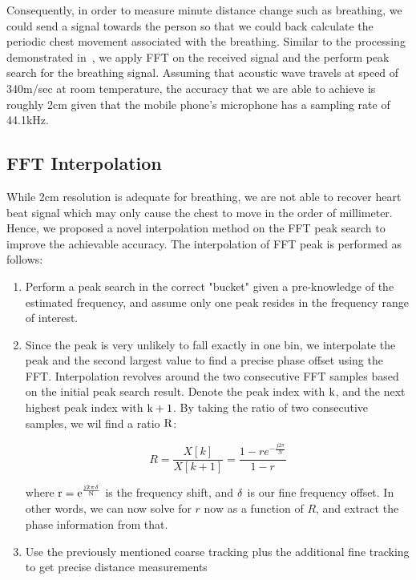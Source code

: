 Consequently, in order to measure minute distance change such as breathing, we could send a signal towards the person so that we could back calculate the periodic chest movement associated with the breathing. Similar to the processing demonstrated in~\cite{Adib_acm15,nandakumar_mobisys15}, we apply FFT on the received signal and the perform peak search for the breathing signal. Assuming that acoustic wave travels at speed of 340m/sec at room temperature, the accuracy that we are able to achieve is roughly 2cm given that the mobile phone's microphone has a sampling rate of 44.1kHz.

\subsection{FFT Interpolation}
\label{sec:fftinterp}
While 2cm resolution is adequate for breathing, we are not able to recover heart beat signal which may only cause the chest to move in the order of millimeter. Hence, we proposed a novel interpolation method on the FFT peak search to improve the achievable accuracy. The interpolation of FFT peak is performed as follows:

%
\begin{enumerate}
	\item Perform a peak search in the correct "bucket" given a pre-knowledge of the estimated frequency, and assume only one peak resides in the frequency range of interest.
	\item Since the peak is very unlikely to fall exactly in one bin, we interpolate the peak and the second largest value to find a precise phase offset using the FFT. Interpolation revolves around the two consecutive FFT samples based on the initial peak search result. Denote the peak index with $\rm k$, and the next highest peak index with $\rm k + 1$. By taking the ratio of two consecutive samples, we wil find a ratio $\rm R$:
	
	\begin{equation}
		\label{eqn:ratio}
		R = \dfrac{X[k]}{X[k+1]} = \dfrac{1 - r e^{-\frac{j2\pi}{N}}}{1 -r}
	\end{equation}

	where $\rm r = e^{\frac{j2\pi\delta}{N}}$ is the frequency shift, and $\rm \delta$ is our fine frequency offset. In other words, we can now solve for $r$ now as a function of $R$, and extract the phase information from that.
	\item Use the previously mentioned coarse tracking plus the additional fine tracking to get precise distance measurements
\end{enumerate} 
%

